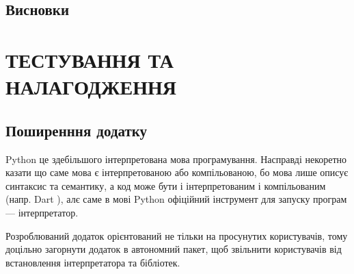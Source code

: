 \documentclass[14pt]{extarticle}
\let\oldsection\section
\renewcommand{\section}{\clearpage\oldsection}
\begin{document}
  \subsection{Висновки}

  \section{ТЕСТУВАННЯ ТА НАЛАГОДЖЕННЯ}
  \subsection{Поширенння додатку}
  Python це здебільшого інтерпретована мова програмування.
  Насправді некоретно казати що саме мова є інтерпретованою або компільованою,
  бо мова лише описує синтаксис та семантику,
  а код може бути і інтерпретованим і компільованим (напр. Dart \cite{dart_lang}),
  алє саме в мові Python офіційний інструмент для запуску програм ---
  інтерпретатор.
  
  Розроблюваний додаток орієнтований не тільки на просунутих користувачів,
  тому доцільно загорнути додаток в автономний пакет,
  щоб звільнити користувачів від встановлення інтерпретатора та бібліотек.
\end{document}
